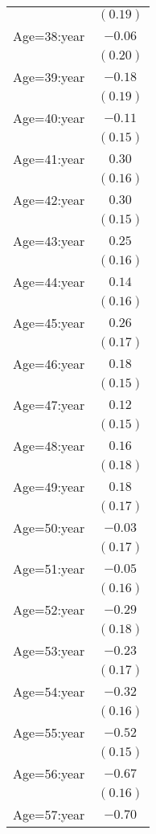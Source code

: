 \documentclass[fullpage]{paper}
\begin{document}
\begin{center}
\begin{longtable}{l c }
            & $(0.19)$ \\
Age=38:year & $-0.06$  \\
            & $(0.20)$ \\
Age=39:year & $-0.18$  \\
            & $(0.19)$ \\
Age=40:year & $-0.11$  \\
            & $(0.15)$ \\
Age=41:year & $0.30$   \\
            & $(0.16)$ \\
Age=42:year & $0.30$   \\
            & $(0.15)$ \\
Age=43:year & $0.25$   \\
            & $(0.16)$ \\
Age=44:year & $0.14$   \\
            & $(0.16)$ \\
Age=45:year & $0.26$   \\
            & $(0.17)$ \\
Age=46:year & $0.18$   \\
            & $(0.15)$ \\
Age=47:year & $0.12$   \\
            & $(0.15)$ \\
Age=48:year & $0.16$   \\
            & $(0.18)$ \\
Age=49:year & $0.18$   \\
            & $(0.17)$ \\
Age=50:year & $-0.03$  \\
            & $(0.17)$ \\
Age=51:year & $-0.05$  \\
            & $(0.16)$ \\
Age=52:year & $-0.29$  \\
            & $(0.18)$ \\
Age=53:year & $-0.23$  \\
            & $(0.17)$ \\
Age=54:year & $-0.32$  \\
            & $(0.16)$ \\
Age=55:year & $-0.52$  \\
            & $(0.15)$ \\
Age=56:year & $-0.67$  \\
            & $(0.16)$ \\
Age=57:year & $-0.70$  \\

\end{longtable}
\end{center}
\end{document}
